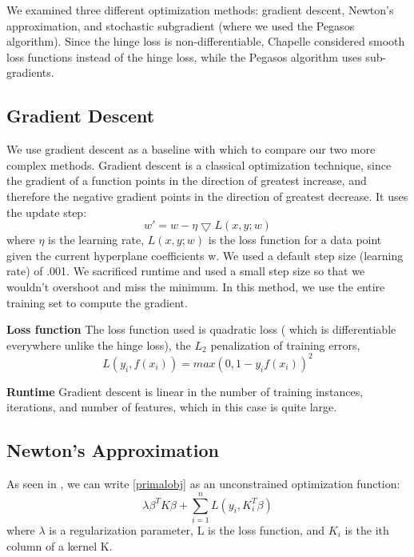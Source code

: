 \documentclass[letterpaper, 11pt]{article}
\begin{document}
We examined three different optimization methods: gradient descent, Newton's approximation, and stochastic subgradient (where we used the Pegasos algorithm).  Since the hinge loss is non-differentiable, Chapelle considered smooth loss functions instead of the hinge loss\cite{chapelle2007training}, while the Pegasos algorithm\cite{pegasos} uses sub-gradients.

\subsection{Gradient Descent}

We use gradient descent as a baseline with which to compare our two more complex methods.
Gradient descent is a classical optimization technique, since the gradient of a function points in the direction of greatest increase, and therefore the negative gradient points in the direction of greatest decrease.  It uses the update step:
\begin{equation}
	w' = w - \eta\bigtriangledown L(x,y; w)
\end{equation} 
where $\eta$ is the learning rate, $L(x,y; w)$ is the loss function for a data point given the current hyperplane coefficients w.  We used a default step size (learning rate) of .001.  We sacrificed runtime and  used a small step size so that we wouldn't overshoot and miss the minimum.  In this method, we use the entire training set to compute the gradient.\cite{menon}

\textbf{Loss function} The loss function used is quadratic loss ( which is differentiable everywhere unlike the hinge loss), the $L_2$ penalization of training errors, $$ L(y_i, f(x_i)) = max (0, 1-y_if(x_i))^2 $$

\textbf{Runtime} Gradient descent is linear in the number of training instances, iterations, and number of features, which in this case is quite large.


\subsection{Newton's Approximation}

As seen in \citeauthor{chapelle2007training}, we can write \eqref{primalobj} as an unconstrained optimization function:
\begin{equation}
	\lambda \beta^TK\beta + \sum_{i=1}^n L(y_i, K_i^T\beta)
	\label{newton}
\end{equation}
 where $\lambda$ is a regularization parameter, L is the loss function, and $K_i$ is the ith column of a kernel K.
\end{document}
